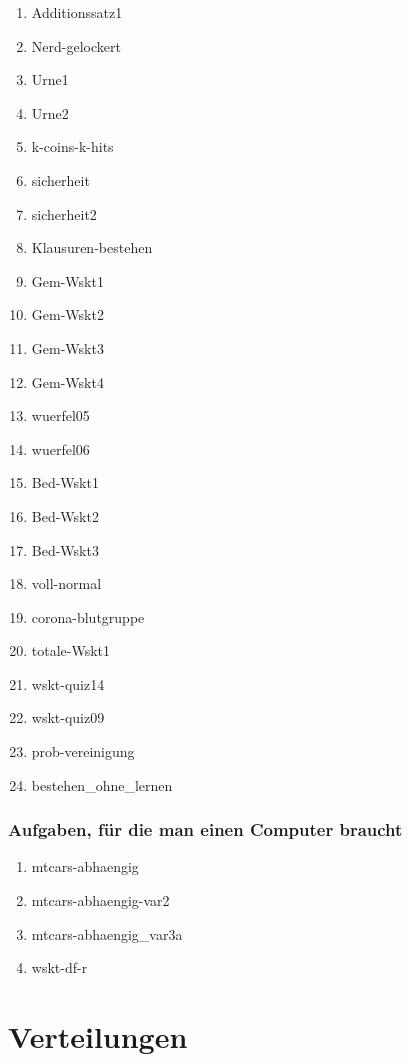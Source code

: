 \documentclass[
  ngerman,
  letterpaper,
  twoside,
  open=any]{scrbook}
\providecommand{\tightlist}{%
  \setlength{\itemsep}{0pt}\setlength{\parskip}{0pt}}\usepackage{longtable,booktabs,array}
\theoremstyle{definition}
\theoremstyle{plain}
\theoremstyle{definition}
\theoremstyle{definition}
\theoremstyle{definition}
\theoremstyle{definition}
\theoremstyle{remark}
\begin{document}
\begin{enumerate}
\def\labelenumi{\arabic{enumi}.}
\tightlist
\item
  Additionssatz1
\item
  Nerd-gelockert
\item
  Urne1
\item
  Urne2
\item
  k-coins-k-hits
\item
  sicherheit
\item
  sicherheit2
\item
  Klausuren-bestehen
\item
  Gem-Wskt1
\item
  Gem-Wskt2
\item
  Gem-Wskt3
\item
  Gem-Wskt4
\item
  wuerfel05
\item
  wuerfel06
\item
  Bed-Wskt1
\item
  Bed-Wskt2
\item
  Bed-Wskt3
\item
  voll-normal
\item
  corona-blutgruppe
\item
  totale-Wskt1
\item
  wskt-quiz14
\item
  wskt-quiz09
\item
  prob-vereinigung
\item
  bestehen\_ohne\_lernen
\end{enumerate}

\subsection{Aufgaben, für die man einen Computer
braucht}\label{aufgaben-fuxfcr-die-man-einen-computer-braucht-2}

\begin{enumerate}
\def\labelenumi{\arabic{enumi}.}
\tightlist
\item
  mtcars-abhaengig
\item
  mtcars-abhaengig-var2
\item
  mtcars-abhaengig\_var3a
\item
  wskt-df-r
\end{enumerate}

\chapter{Verteilungen}\label{verteilungen}
\end{document}
